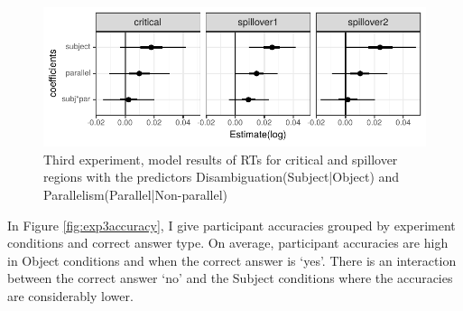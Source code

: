 \begin{knitrout}
\color{fgcolor}\begin{figure}[hbt!]

{\centering \includegraphics[]{experiments/equivalance/report/figure/exp3critandsomodel-1.pdf} 

}

\caption[Third experiment, model results of RTs for critical and spillover regions with the predictors Disambiguation(Subject|Object) and Parallelism(Parallel|Non-parallel)]{Third experiment, model results of RTs for critical and spillover regions with the predictors Disambiguation(Subject|Object) and Parallelism(Parallel|Non-parallel)}\label{fig:exp3critandsomodel}
\end{figure}


\end{knitrout}

In Figure \ref{fig:exp3accuracy}, I give participant accuracies grouped by experiment conditions and correct answer type. On average, participant accuracies are high in Object conditions and when the correct answer is `yes'. There is an interaction between the correct answer `no' and the Subject conditions where the accuracies are considerably lower.

